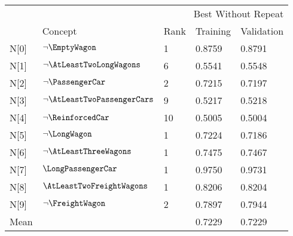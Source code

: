 \begin{tabular}{lllll}
\toprule
 & \multicolumn{4}{r}{Best Without Repeat} \\
 & Concept & Rank & Training & Validation \\
\midrule
N[0] & $\neg \EmptyWagon$ & 1 & 0.8759 & 0.8791 \\
N[1] & $\neg \AtLeastTwoLongWagons$ & 6 & 0.5541 & 0.5548 \\
N[2] & $\neg \PassengerCar$ & 2 & 0.7215 & 0.7197 \\
N[3] & $\neg \AtLeastTwoPassengerCars$ & 9 & 0.5217 & 0.5218 \\
N[4] & $\neg \ReinforcedCar$ & 10 & 0.5005 & 0.5004 \\
N[5] & $\neg \LongWagon$ & 1 & 0.7224 & 0.7186 \\
N[6] & $\neg \AtLeastThreeWagons$ & 1 & 0.7475 & 0.7467 \\
N[7] & $\LongPassengerCar$ & 1 & 0.9750 & 0.9731 \\
N[8] & $\AtLeastTwoFreightWagons$ & 1 & 0.8206 & 0.8204 \\
N[9] & $\neg \FreightWagon$ & 2 & 0.7897 & 0.7944 \\
Mean &  &  & 0.7229 & 0.7229 \\
\bottomrule
\end{tabular}
